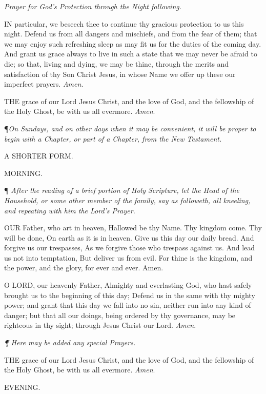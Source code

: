 \emph{Prayer
for God’s Protection through the Night following.}

IN
particular, we beseech thee to continue thy gracious protection to us
this night. Defend us from all dangers and mischiefs, and from the fear
of them; that we may enjoy such refreshing sleep as may fit us for the
duties of the coming day. And grant us grace always to live in such a
state that we may never be afraid to die; so that, living and dying, we
may be thine, through the merits and satisfaction of thy Son Christ Jesus,
in whose Name we offer up these our imperfect prayers. \emph{Amen}.

THE
grace of our Lord Jesus Christ, and the love of God, and the fellowship
of the Holy Ghost, be with us all evermore. \emph{Amen}.

¶\emph{On Sundays, and on other days when it may be convenient, it will be proper
to begin with a Chapter, or part of a Chapter, from the New Testament.}

\emph{}

\emph{}

A SHORTER FORM.

MORNING.

¶ \emph{After the reading of a brief portion of Holy Scripture, let
the Head of the Household, or some other member of the family, say as
followeth, all kneeling, and repeating with him the Lord's Prayer.}

OUR
Father, who art in heaven, Hallowed be thy Name. Thy kingdom come. Thy
will be done, On earth as it is in heaven. Give us this day our daily
bread. And forgive us our trespasses, As we forgive those who trespass
against us. And lead us not into temptation, But deliver us from evil.
For thine is the kingdom, and the power, and the glory, for ever and ever.
Amen.

O
LORD, our heavenly Father, Almighty and everlasting God, who hast safely
brought us to the beginning of this day; Defend us in the same with thy
mighty power; and grant that this day we fall into no sin, neither run
into any kind of danger; but that all our doings, being ordered by thy
governance, may be righteous in thy sight; through Jesus Christ our Lord.
\emph{Amen}.

\emph{¶
Here may be added any special Prayers.}

THE
grace of our Lord Jesus Christ, and the love of God, and the fellowship
of the Holy Ghost, be with us all evermore. \emph{Amen}.

EVENING.

